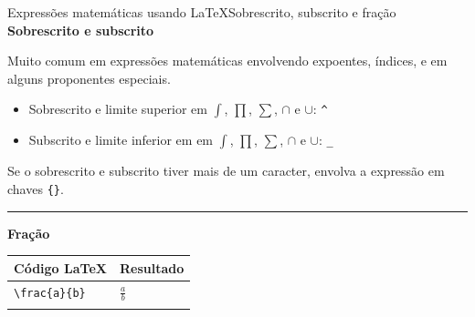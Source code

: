 \documentclass[
  10pt,
  ignorenonframetext,
]{beamer}
\providecommand{\tightlist}{%
  \setlength{\itemsep}{0pt}\setlength{\parskip}{0pt}}\usepackage{longtable,booktabs,array}
\newcommand*{\regrafina}{\rule{\textwidth}{0.5pt}}
\begin{document}
\begin{frame}[fragile]{Expressões matemáticas usando
\LaTeX\newline Sobrescrito, subscrito e fração}
\protect\hypertarget{expressuxf5es-matemuxe1ticas-usando-sobrescrito-subscrito-e-frauxe7uxe3o}{}
\textbf{Sobrescrito e subscrito}

Muito comum em expressões matemáticas envolvendo expoentes, índices, e
em alguns proponentes especiais.

\begin{itemize}
\tightlist
\item
  Sobrescrito e limite superior em \(\int\), \(\prod\), \(\sum\),
  \(\cap\) e \(\cup\): \texttt{\^{}}
\item
  Subscrito e limite inferior em em \(\int\), \(\prod\), \(\sum\),
  \(\cap\) e \(\cup\): \texttt{\_}
\end{itemize}

Se o sobrescrito e subscrito tiver mais de um caracter, envolva a
expressão em chaves \texttt{\{\}}.

\regrafina

\textbf{Fração}

\begin{longtable}[]{@{}ll@{}}
\toprule\noalign{}
Código \LaTeX & Resultado \\
\midrule\noalign{}
\endhead
\texttt{\textbackslash{}frac\{a\}\{b\}} & \(\frac{a}{b}\) \\
\bottomrule\noalign{}
\end{longtable}
\end{frame}
\end{document}
